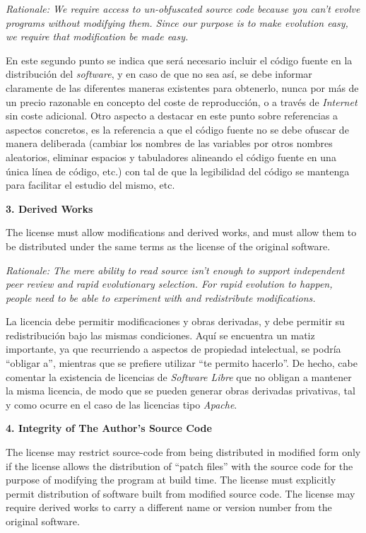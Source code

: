 \textit{Rationale: We require access to un-obfuscated source code because you
can't evolve programs without modifying them. Since our purpose is to make
evolution easy, we require that modification be made easy.}\vspace{0.4cm}

En este segundo punto se indica que será necesario incluir el código fuente en
la distribución del \textit{software}, y en caso de que no sea así, se debe
informar claramente de las diferentes maneras existentes para obtenerlo, nunca
por más de un precio razonable en concepto del coste de reproducción, o a través
de \textit{Internet} sin coste adicional. Otro aspecto a destacar en este punto
sobre referencias a aspectos concretos, es la referencia a que el código fuente
no se debe ofuscar de manera deliberada (cambiar los nombres de las variables
por otros nombres aleatorios, eliminar espacios y tabuladores alineando el
código fuente en una única línea de código, etc.) con tal de que la legibilidad
del código se mantenga para facilitar el estudio del mismo, etc.\vspace{0.4cm}

{\bf 3. Derived Works

The license must allow modifications and derived works, and must allow them to
be distributed under the same terms as the license of the original software.}

\textit{Rationale: The mere ability to read source isn't enough to support
independent peer review and rapid evolutionary selection. For rapid evolution to
happen, people need to be able to experiment with and redistribute
modifications.}\vspace{0.4cm}

La licencia debe permitir modificaciones y obras derivadas, y debe permitir su
redistribución bajo las mismas condiciones. Aquí se encuentra un matiz
importante, ya que recurriendo a aspectos de propiedad intelectual, se podría
``obligar a'', mientras que se prefiere utilizar ``te permito
hacerlo''. De hecho, cabe comentar la existencia de licencias de
\textit{Software Libre} que no obligan a mantener la misma licencia, de modo que
se pueden generar obras derivadas privativas, tal y como ocurre en el caso de
las licencias tipo \textit{Apache}.\vspace{0.4cm}

{\bf 4. Integrity of The Author's Source Code

The license may restrict source-code from being distributed in modified form
only if the license allows the distribution of ``patch files'' with the source
code for the purpose of modifying the program at build time. The license must
explicitly permit distribution of software built from modified source code. The
license may require derived works to carry a different name or version number
from the original software.}

